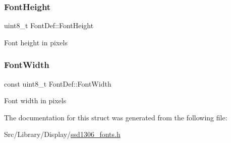 \subsubsection{\texorpdfstring{Font\+Height}{FontHeight}}
{\footnotesize\ttfamily uint8\+\_\+t Font\+Def\+::\+Font\+Height}

Font height in pixels \mbox{\label{struct_font_def_a9e22d0bdbc21eadba6155f31d742f85f}} 
\subsubsection{\texorpdfstring{Font\+Width}{FontWidth}}
{\footnotesize\ttfamily const uint8\+\_\+t Font\+Def\+::\+Font\+Width}

Font width in pixels 

The documentation for this struct was generated from the following file\+:\begin{DoxyCompactItemize}
\item 
Src/\+Library/\+Display/\hyperlink{ssd1306__fonts_8h}{ssd1306\+\_\+fonts.\+h}\end{DoxyCompactItemize}
